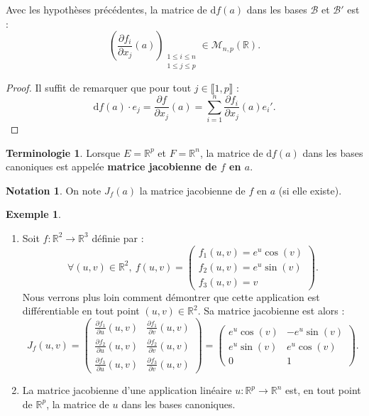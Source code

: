 \documentclass[french]{article}
\newcommand{\R}{\mathbb{R}}
\renewcommand{\d}{\text{d}}
\theoremstyle{plain}
\theoremstyle{definition}
\newtheorem*{ex}{Exemple}
\newtheorem*{notation}{Notation}
\newtheorem*{terminologie}{Terminologie}
\theoremstyle{remark}
\begin{document}
\begin{prop}%
	Avec les hypothèses précédentes, la matrice de $\d f(a)$ dans les bases $\mathcal{B}$ et $\mathcal{B}'$ est : 
	$$\left(\frac{\partial f_i}{\partial x_j}(a)\right)_{\substack{1\leqslant i\leqslant n\\ 1\leqslant j\leqslant p}}\in\mathcal{M}_{n,p}(\R).$$
\end{prop}
\begin{proof}
	Il suffit de remarquer que pour tout $j\in\llbracket1,p\rrbracket$ : 
	$$\d f(a)\cdot e_j=\frac{\partial f}{\partial x_j}(a)=\sum_{i=1}^{n}\frac{\partial f_i}{\partial x_j}(a)e_i'.$$
\end{proof}

\begin{terminologie}
	Lorsque $E=\R^p$ et $F=\R^n$, la matrice de $\d f(a)$ dans les bases canoniques est appelée \textbf{matrice jacobienne de $f$ en $a$}.
\end{terminologie}

\begin{notation}
	On note $J_f(a)$ la matrice jacobienne de $f$ en $a$ (si elle existe).
\end{notation}

\begin{ex}
	\begin{enumerate}
		\item Soit $f:\R^2\to\R^3$ définie par : 
		$$\forall (u,v)\in\R^2,\ f(u,v)=\begin{pmatrix}
			f_1(u,v)=e^u\cos(v)\\
			f_2(u,v)=e^u\sin(v)\\
			f_3(u,v)=v
		\end{pmatrix}.$$ Nous verrons plus loin comment démontrer que cette application est différentiable en tout point $(u,v)\in\R^2$. Sa matrice jacobienne est alors :
		$$J_f(u,v)=\begin{pmatrix}
			\displaystyle\frac{\partial f_1}{\partial u}(u,v)&\displaystyle\frac{\partial f_1}{\partial v}(u,v)\\[3mm]
			\displaystyle\frac{\partial f_2}{\partial u}(u,v)&\displaystyle\frac{\partial f_2}{\partial v}(u,v)\\[3mm]
			\displaystyle\frac{\partial f_3}{\partial u}(u,v)&\displaystyle\frac{\partial f_3}{\partial v}(u,v)
		\end{pmatrix}=\begin{pmatrix}
		e^u\cos(v)&-e^u\sin(v)\\
		e^u\sin(v)&e^u\cos(v)\\
		0&1
		\end{pmatrix}.$$
		\item La matrice jacobienne d'une application linéaire $u:\R^p\to\R^n$ est, en tout point de $\R^p$, la matrice de $u$ dans les bases canoniques.
	\end{enumerate}
\end{ex}
\end{document}
